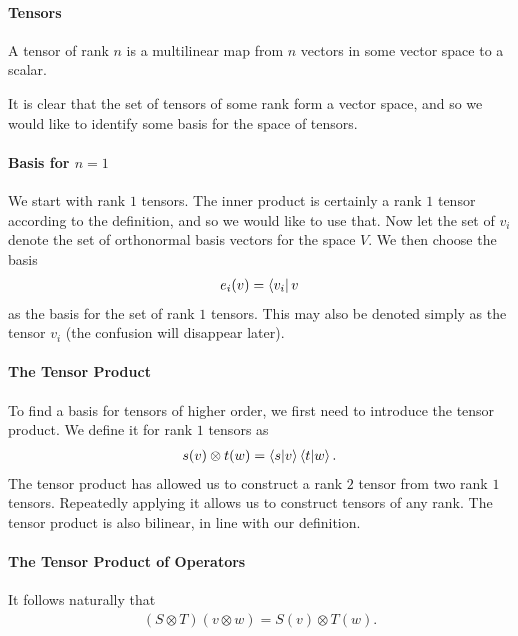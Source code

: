\paragraph{Tensors}
A tensor of rank $n$ is a multilinear map from $n$ vectors in some vector space to a scalar.

It is clear that the set of tensors of some rank form a vector space, and so we would like to identify some basis for the space of tensors.

\paragraph{Basis for $n = 1$}
We start with rank $1$ tensors. The inner product is certainly a rank $1$ tensor according to the definition, and so we would like to use that. Now let the set of $v_{i}$ denote the set of orthonormal basis vectors for the space $V$. We then choose the basis
\begin{align*}
	e_{i}(v) = \bra{v_{i}}{v}
\end{align*}
as the basis for the set of rank $1$ tensors. This may also be denoted simply as the tensor $v_{i}$ (the confusion will disappear later).

\paragraph{The Tensor Product}
To find a basis for tensors of higher order, we first need to introduce the tensor product. We define it for rank $1$ tensors as
\begin{align*}
	s(v)\otimes t(w) = \braket{s}{v}\braket{t}{w}.
\end{align*}
The tensor product has allowed us to construct a rank $2$ tensor from two rank $1$ tensors. Repeatedly applying it allows us to construct tensors of any rank. The tensor product is also bilinear, in line with our definition.

\paragraph{The Tensor Product of Operators}
It follows naturally that
\begin{align*}
	(S\otimes T)(v\otimes w) = S(v)\otimes T(w).
\end{align*}